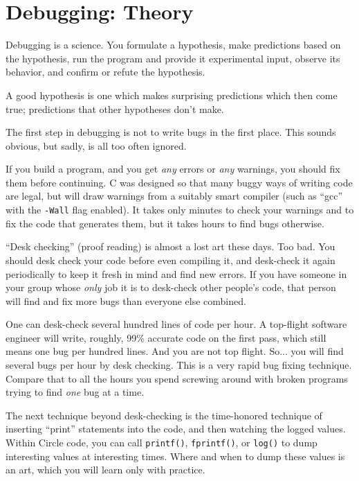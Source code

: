 \documentclass{article}
\begin{document}
\section{Debugging: Theory}

Debugging is a science.  You formulate a hypothesis, make predictions based on the hypothesis, run the program and provide it experimental input, observe its behavior, and confirm or refute the hypothesis.
\par
A good hypothesis is one which makes surprising predictions which then come true; predictions that other hypotheses don't make.
\par
The first step in debugging is not to write bugs in the first place. This sounds obvious, but sadly, is all too often ignored.
\par
If you build a program, and you get {\em any} errors or {\em any} warnings, you should fix them before continuing.  C was designed so that many buggy ways of writing code are legal, but will draw warnings from a suitably smart compiler (such as ``gcc'' with the \texttt{-Wall} flag enabled).  It
takes only minutes to check your warnings and to fix the code that generates them, but it takes hours to find bugs otherwise.
\par
``Desk checking'' (proof reading) is almost a lost art these days. Too bad.  You should desk check your code before even compiling it, and desk-check it again periodically to keep it fresh in mind and find new errors.  If you have someone in your group whose {\em only} job it is to desk-check other people's code, that person will find and fix more bugs than everyone else combined.
\par
One can desk-check several hundred lines of code per hour.  A top-flight software engineer will write, roughly, 99\% accurate code on the first pass, which still means one bug per hundred lines.  And you are not top flight.  So... you will find several bugs per hour by desk checking.  This is a very rapid bug fixing technique.  Compare that to all the hours you spend screwing around with broken programs trying to find {\em one} bug at a time.
\par
The next technique beyond desk-checking is the time-honored technique of inserting ``print'' statements into the code, and then watching the logged values.  Within Circle code, you can call \texttt{printf()}, \texttt{fprintf()}, or \texttt{log()} to dump interesting values at interesting times.  Where and when to dump these values is an art, which you will learn only with practice.
\par
\end{document}
